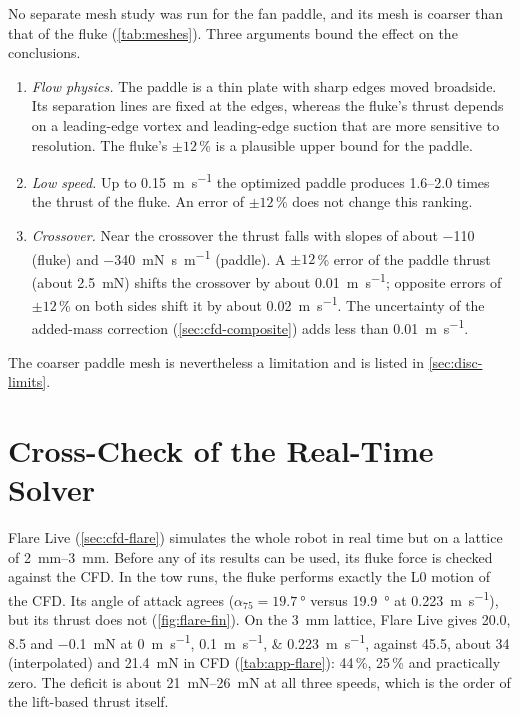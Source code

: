 No separate mesh study was run for the fan paddle, and its mesh is coarser than that of the fluke
(\cref{tab:meshes}). Three arguments bound the effect on the conclusions.
\begin{enumerate}
  \item \emph{Flow physics.} The paddle is a thin plate with sharp edges moved broadside. Its separation lines are
        fixed at the edges, whereas the fluke's thrust depends on a leading-edge vortex and leading-edge suction
        that are more sensitive to resolution. The fluke's $\pm12$\,\% is a plausible upper bound for the paddle.
  \item \emph{Low speed.} Up to \SI{0.15}{\metre\per\second} the optimized paddle produces 1.6--2.0 times the thrust
        of the fluke. An error of $\pm12$\,\% does not change this ranking.
  \item \emph{Crossover.} Near the crossover the thrust falls with slopes of about \SI{-110}{} (fluke) and
        \SI{-340}{\milli\newton\second\per\metre} (paddle). A $\pm12$\,\% error of the paddle thrust
        (about \SI{2.5}{\milli\newton}) shifts the crossover by about \SI{0.01}{\metre\per\second}; opposite
        errors of $\pm12$\,\% on both sides shift it by about \SI{0.02}{\metre\per\second}. The uncertainty of the
        added-mass correction (\cref{sec:cfd-composite}) adds less than \SI{0.01}{\metre\per\second}.
\end{enumerate}
The coarser paddle mesh is nevertheless a limitation and is listed in \cref{sec:disc-limits}.

\section{Cross-Check of the Real-Time Solver}
\label{sec:ver-flare}
\label{sec:res-flare}

Flare Live (\cref{sec:cfd-flare}) simulates the whole robot in real time but on a lattice of \SIrange{2}{3}{\milli\metre}. Before
any of its results can be used, its fluke force is checked against the CFD. In the tow runs, the fluke performs exactly the L0 motion of the CFD. Its
angle of attack agrees ($\alpha_{75}=\SI{19.7}{\degree}$ versus \SI{19.9}{\degree} at \SI{0.223}{\metre\per\second}), but its
thrust does not (\cref{fig:flare-fin}). On the \SI{3}{\milli\metre} lattice, Flare Live gives \SI{20.0}{},
\SI{8.5}{} and \SI{-0.1}{\milli\newton} at \SIlist{0;0.1;0.223}{\metre\per\second}, against \SI{45.5}{}, about \SI{34}{} (interpolated) and \SI{21.4}{\milli\newton} in CFD (\cref{tab:app-flare}): 44\,\%, 25\,\% and practically zero. The deficit is about
\SIrange{21}{26}{\milli\newton} at all three speeds, which is the order of the lift-based thrust itself.


